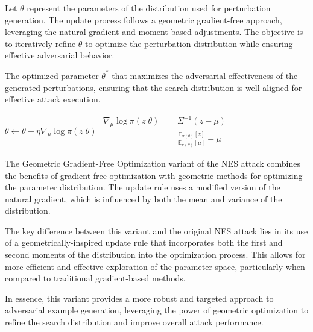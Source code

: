 Let \( \theta \) represent the parameters of the distribution used for perturbation generation. The update process follows a geometric gradient-free approach, leveraging the natural gradient and moment-based adjustments. The objective is to iteratively refine \( \theta \) to optimize the perturbation distribution while ensuring effective adversarial behavior.

The optimized parameter \( \theta^* \) that maximizes the adversarial effectiveness of the generated perturbations, ensuring that the search distribution is well-aligned for effective attack execution.


$\theta \leftarrow \theta + \eta \nabla_\mu \log \pi (z | \theta)$
$
\begin{aligned}
\nabla_\mu \log \pi (z | \theta) &= \Sigma^{-1} (z - \mu)\\
&= \frac{\mathbb{E}_{\pi(\theta)}[z]}{\mathbb{E}_{\pi(\theta)}[\mu]} - \mu
\end{aligned}
$

The Geometric Gradient-Free Optimization variant of the NES attack combines the benefits of gradient-free optimization with geometric methods for optimizing the parameter distribution. The update rule uses a modified version of the natural gradient, which is influenced by both the mean and variance of the distribution.

The key difference between this variant and the original NES attack lies in its use of a geometrically-inspired update rule that incorporates both the first and second moments of the distribution into the optimization process. This allows for more efficient and effective exploration of the parameter space, particularly when compared to traditional gradient-based methods.

In essence, this variant provides a more robust and targeted approach to adversarial example generation, leveraging the power of geometric optimization to refine the search distribution and improve overall attack performance.